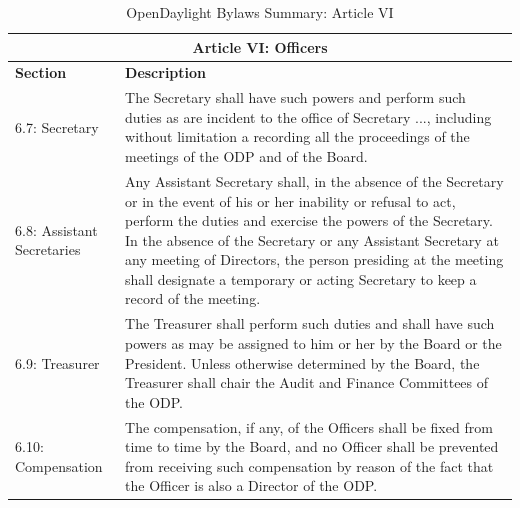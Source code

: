 \documentclass[a4paper, 12pt]{book}
\begin{document}
\begin{table}[H]
  \begin{center}
    \begin{tabular}{ | p{4cm} | p{11cm} | }
    \toprule
    \multicolumn {2}{|c|}{\textbf{Article VI: Officers}} \\
    \hline
    \textbf{Section} & \textbf{Description} \\
    \hline
    6.7: Secretary & The Secretary shall have such powers and perform such duties as are incident to the office of Secretary ..., including without limitation a recording all the proceedings of the meetings of the ODP and of the Board.\\
    \hline
    6.8: Assistant Secretaries & Any Assistant Secretary shall, in the absence of the Secretary or in the event of his or her inability or refusal to act, perform the duties and exercise the powers of the Secretary.  In the absence of the Secretary or any Assistant Secretary at any meeting of Directors, the person presiding at the meeting shall designate a temporary or acting Secretary to keep a record of the meeting.\\
    \hline
    6.9: Treasurer & The Treasurer shall perform such duties and shall have such powers as may be assigned to him or her by the Board or the President.  Unless otherwise determined by the Board, the Treasurer shall chair the Audit and Finance Committees of the ODP.\\
    \hline
    6.10: Compensation & The compensation, if any, of the Officers shall be fixed from time to time by the Board, and no Officer shall be prevented from receiving such compensation by reason of the fact that the Officer is also a Director of the ODP.\\
    \bottomrule
    \end{tabular}
    \caption{OpenDaylight Bylaws Summary: Article VI}
    \label{tab:odlbylaws-art06}
  \end{center}
\end{table}
\end{document}
